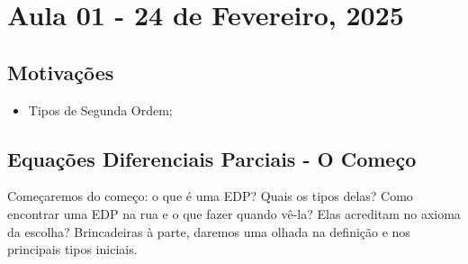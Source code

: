 \documentclass[../pde_notes.tex]{subfiles}
\begin{document}
\section{Aula 01 - 24 de Fevereiro, 2025}
\subsection{Motivações}
\begin{itemize}
	\item Tipos de Segunda Ordem;
\end{itemize}
\subsection{Equações Diferenciais Parciais - O Começo}
Começaremos do começo: o que é uma EDP? Quais os tipos delas? Como encontrar uma EDP na rua e o que fazer quando vê-la? Elas acreditam no axioma da escolha? Brincadeiras à parte, daremos uma olhada na definição e nos principais tipos iniciais.
\end{document}

